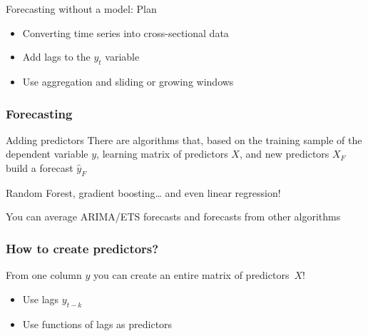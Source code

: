 
\begin{frame} %
	
	
\end{frame}



\begin{frame}{Forecasting without a model: Plan}
	\begin{itemize}[<+->]
		\item Converting time series into \alert{cross-sectional} data
		\item Add \alert{lags} to the $y_t$ variable
		\item Use \alert{aggregation} and \alert{sliding} or \alert{growing} windows
	\end{itemize}
	
\end{frame}


\begin{frame}
	\frametitle{Forecasting}
	
	\begin{block}{Adding predictors}
		There are algorithms that, based on the training sample of the dependent variable $y$,
		learning matrix of predictors $X$, and new predictors $X_F$ build a forecast $\hat y_F$
	\end{block}
	
	\pause
	
	\alert{Random Forest}, \alert{gradient boosting}\ldots{ }\pause and even \alert{linear regression}!
	
	\pause
	
	You can \alert{average} ARIMA/ETS forecasts and forecasts from other algorithms
	
\end{frame}


\begin{frame}
	\frametitle{How to create predictors?}
	
	From one column $y$ you can create an entire matrix of  predictors~$X$!
	
	\begin{itemize}[<+->]
		\item Use \alert{lags} $y_{t-k}$
		\item Use \alert{functions of lags} as predictors
	\end{itemize}
	
	
\end{frame}

